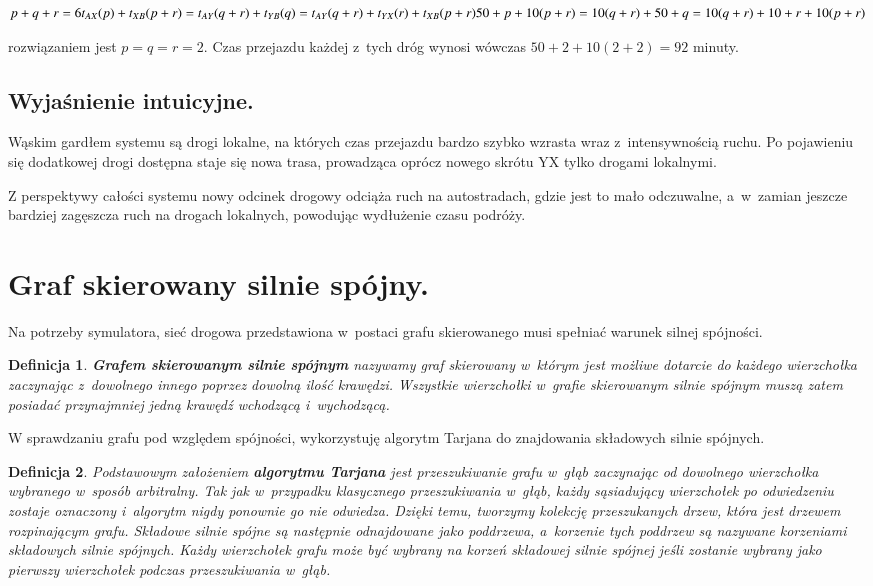 \documentclass[twoside,12pt]{report}
\newtheorem{definition}{Definicja} %
\begin{document}
\begin{center}
\begin{math}
p+q+r = 6 \newline
t_{AX}(p)+t_{XB}(p+r) = t_{AY}(q+r) + t_{YB}(q) = t_{AY}(q+r)+t_{YX}(r)+t_{XB}(p+r)\newline
50+p+10(p+r) = 10(q+r)+50+q = 10(q+r)+ 10 + r + 10(p+r)\newline
\end{math}
\end{center}
rozwiązaniem jest $p=q=r=2$.
Czas przejazdu każdej z~tych dróg wynosi wówczas $50+2+10(2+2)=92$ minuty.

\subsection{Wyjaśnienie intuicyjne.}
Wąskim gardłem systemu są drogi lokalne, na których czas przejazdu bardzo szybko wzrasta wraz z~intensywnością ruchu. Po pojawieniu się dodatkowej drogi dostępna staje się nowa trasa, prowadząca oprócz nowego skrótu YX tylko drogami lokalnymi.

Z perspektywy całości systemu nowy odcinek drogowy odciąża ruch na autostradach, gdzie jest to mało odczuwalne, a~w~zamian jeszcze bardziej zagęszcza ruch na drogach lokalnych, powodując wydłużenie czasu podróży.

\section{Graf skierowany silnie spójny.}
Na potrzeby symulatora, sieć drogowa przedstawiona w~postaci grafu skierowanego musi spełniać warunek silnej spójności. 
\newline
\begin{definition}\label{Graf silnie spójny}
\textbf{Grafem skierowanym silnie spójnym} nazywamy graf skierowany w~którym jest możliwe dotarcie do każdego wierzchołka zaczynając z~dowolnego innego poprzez dowolną ilość krawędzi. Wszystkie wierzchołki w~grafie skierowanym silnie spójnym muszą zatem posiadać przynajmniej jedną krawędź wchodzącą i~wychodzącą\cite{silniespojny}.
\end{definition}

W sprawdzaniu grafu pod względem spójności, wykorzystuję algorytm Tarjana do znajdowania składowych silnie spójnych.
\newline
\begin{definition}\label{Algorytm Tarjana}
Podstawowym założeniem \textbf{algorytmu Tarjana} jest przeszukiwanie grafu w~głąb zaczynając od dowolnego wierzchołka wybranego w~sposób arbitralny. Tak jak w~przypadku klasycznego przeszukiwania w~głąb, każdy sąsiadujący wierzchołek po odwiedzeniu zostaje oznaczony i~algorytm nigdy ponownie go nie odwiedza. Dzięki temu, tworzymy kolekcję przeszukanych drzew, która jest drzewem rozpinającym grafu. Składowe silnie spójne są następnie odnajdowane jako poddrzewa, a~korzenie tych poddrzew są nazywane korzeniami składowych silnie spójnych. Każdy wierzchołek grafu może być wybrany na korzeń składowej silnie spójnej jeśli zostanie wybrany jako pierwszy wierzchołek podczas przeszukiwania w~głąb.
\end{definition}
\end{document}
